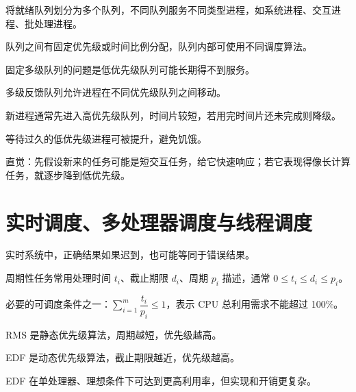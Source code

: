 \begin{points}
  \item 将就绪队列划分为多个队列，不同队列服务不同类型进程，如系统进程、交互进程、批处理进程。
  \item 队列之间有固定优先级或时间比例分配，队列内部可使用不同调度算法。
  \item 固定多级队列的问题是低优先级队列可能长期得不到服务。
\end{points}


\begin{points}
  \item 多级反馈队列允许进程在不同优先级队列之间移动。
  \item 新进程通常先进入高优先级队列，时间片较短，若用完时间片还未完成则降级。
  \item 等待过久的低优先级进程可被提升，避免饥饿。
  \item 直觉：先假设新来的任务可能是短交互任务，给它快速响应；若它表现得像长计算任务，就逐步降到低优先级。
\end{points}


\section{实时调度、多处理器调度与线程调度}
\begin{points}
  \item 实时系统中，正确结果如果迟到，也可能等同于错误结果。
  \item 周期性任务常用处理时间 $t_i$、截止期限 $d_i$、周期 $p_i$ 描述，通常 $0\le t_i\le d_i\le p_i$。
  \item 必要的可调度条件之一：$\sum_{i=1}^{m}\dfrac{t_i}{p_i}\le 1$，表示 CPU 总利用需求不能超过 100\%。
\end{points}


\begin{points}
  \item RMS 是静态优先级算法，周期越短，优先级越高。
  \item EDF 是动态优先级算法，截止期限越近，优先级越高。
  \item EDF 在单处理器、理想条件下可达到更高利用率，但实现和开销更复杂。
\end{points}


